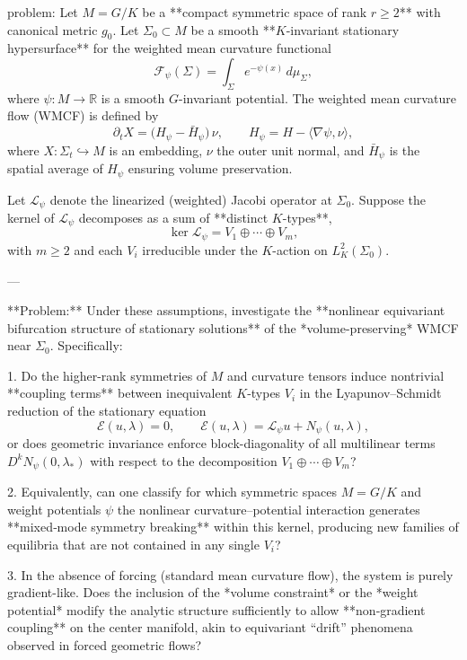 problem:  
Let \( M = G/K \) be a **compact symmetric space of rank \( r \ge 2 \)** with canonical metric \( g_0 \).  
Let \( \Sigma_0 \subset M \) be a smooth **\(K\)-invariant stationary hypersurface** for the weighted mean curvature functional  
\[
\mathcal{F}_\psi(\Sigma) = \int_{\Sigma} e^{-\psi(x)}\, d\mu_\Sigma,
\]
where \( \psi : M \to \mathbb{R} \) is a smooth \(G\)-invariant potential.  
The weighted mean curvature flow (WMCF) is defined by  
\[
\partial_t X = \big( H_\psi - \bar{H}_\psi \big)\, \nu, \qquad H_\psi = H - \langle \nabla \psi, \nu \rangle,
\]
where \( X: \Sigma_t \hookrightarrow M \) is an embedding, \( \nu \) the outer unit normal, and \( \bar{H}_\psi \) is the spatial average of \(H_\psi\) ensuring volume preservation.  

Let \( \mathcal{L}_\psi \) denote the linearized (weighted) Jacobi operator at \(\Sigma_0\).  
Suppose the kernel of \( \mathcal{L}_\psi \) decomposes as a sum of **distinct \(K\)-types**,  
\[
\ker \mathcal{L}_\psi = V_1 \oplus \cdots \oplus V_m,
\]
with \( m \ge 2 \) and each \(V_i\) irreducible under the \(K\)-action on \(L^2_K(\Sigma_0)\).

---

**Problem:**  
Under these assumptions, investigate the **nonlinear equivariant bifurcation structure of stationary solutions** of the *volume-preserving* WMCF near \(\Sigma_0\).  
Specifically:

1. Do the higher-rank symmetries of \(M\) and curvature tensors induce nontrivial **coupling terms** between inequivalent \(K\)-types \( V_i \) in the Lyapunov–Schmidt reduction of the stationary equation  
   \[
   \mathcal{E}(u,\lambda) = 0, \qquad \mathcal{E}(u,\lambda) = \mathcal{L}_\psi u + N_\psi(u,\lambda),
   \]
   or does geometric invariance enforce block-diagonality of all multilinear terms \( D^k N_\psi(0, \lambda_*) \) with respect to the decomposition \(V_1 \oplus \cdots \oplus V_m\)?

2. Equivalently, can one classify for which symmetric spaces \(M=G/K\) and weight potentials \(\psi\) the nonlinear curvature–potential interaction generates **mixed‑mode symmetry breaking** within this kernel, producing new families of equilibria that are not contained in any single \(V_i\)?

3. In the absence of forcing (standard mean curvature flow), the system is purely gradient-like. Does the inclusion of the *volume constraint* or the *weight potential* modify the analytic structure sufficiently to allow **non‑gradient coupling** on the center manifold, akin to equivariant “drift” phenomena observed in forced geometric flows?

